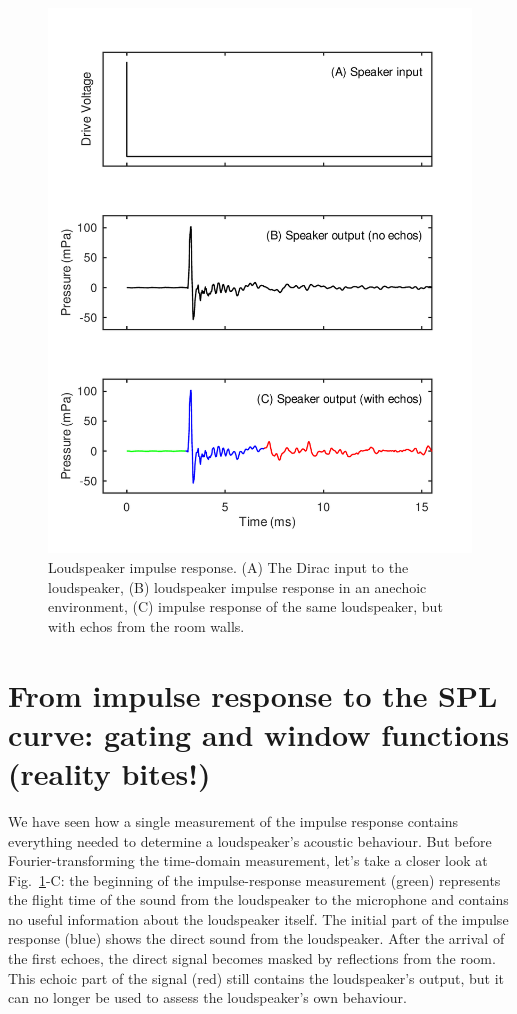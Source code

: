 \documentclass[12pt,a4paper]{article}
\providecommand{\figlabel}[1]{\label{fig:#1}}
\providecommand{\figr}[1]{Fig.~\ref{fig:#1}}
\begin{document}
\begin{figure}[tbp]
  \begin{center}
    \includegraphics{FIGURE1}
    \caption{Loudspeaker impulse response. (A) The Dirac input to the loudspeaker, (B) loudspeaker impulse response in an anechoic environment, (C) impulse response of the same loudspeaker, but with echos from the room walls.}
    \figlabel{FIGURE1}
  \end{center}
\end{figure}

\section{From impulse response to the SPL curve: gating and window functions (reality bites!)}

We have seen how a single measurement of the impulse response contains everything needed to determine a loudspeaker’s acoustic behaviour.
But before Fourier-transforming the time-domain measurement, let's take a closer look at \figr{FIGURE1}-C: the beginning of the impulse-response measurement (green) represents the flight time of the sound from the loudspeaker to the microphone and contains no useful information about the loudspeaker itself.
The initial part of the impulse response (blue) shows the direct sound from the loudspeaker.
After the arrival of the first echoes, the direct signal becomes masked by reflections from the room.
This echoic part of the signal (red) still contains the loudspeaker’s output, but it can no longer be used to assess the loudspeaker’s own behaviour.
\end{document}

